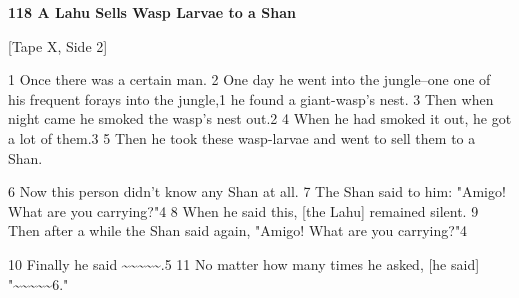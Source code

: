 
\textbf{118 A Lahu Sells Wasp Larvae to a Shan }

[Tape X, Side 2]

1 Once there was a certain man. 2 One day he went into the jungle--one one of his
frequent forays into the jungle,1 he found a giant-wasp's nest. 3 Then when night
came he smoked the wasp's nest out.2 4 When he had smoked it out, he got a lot
of them.3 5 Then he took these wasp-larvae and went to sell them to a Shan.

6 Now this person didn't know any Shan at all. 7 The Shan said to him: "Amigo!
What are you carrying?"4 8 When he said this, [the Lahu] remained silent.
9 Then after a while the Shan said again, "Amigo! What are you carrying?"4

10 Finally he said \textasciitilde{}\textasciitilde{}\textasciitilde{}\textasciitilde{}\textasciitilde{}.5
11 No matter how many times he asked, [he said] "\textasciitilde{}\textasciitilde{}\textasciitilde{}\textasciitilde{}\textasciitilde{}6."

